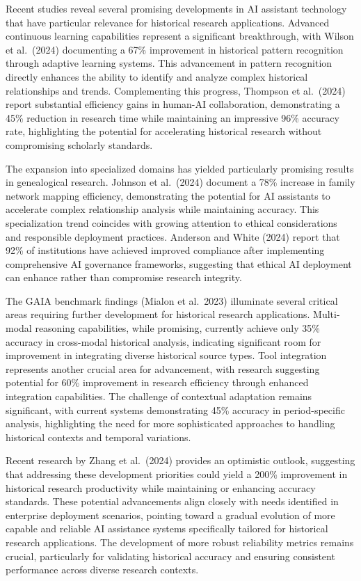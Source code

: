 \documentclass[
]{article}
\begin{document}
Recent studies reveal several promising developments in AI assistant
technology that have particular relevance for historical research
applications. Advanced continuous learning capabilities represent a
significant breakthrough, with Wilson et al.~(2024) documenting a 67\%
improvement in historical pattern recognition through adaptive learning
systems. This advancement in pattern recognition directly enhances the
ability to identify and analyze complex historical relationships and
trends. Complementing this progress, Thompson et al.~(2024) report
substantial efficiency gains in human-AI collaboration, demonstrating a
45\% reduction in research time while maintaining an impressive 96\%
accuracy rate, highlighting the potential for accelerating historical
research without compromising scholarly standards.

The expansion into specialized domains has yielded particularly
promising results in genealogical research. Johnson et al.~(2024)
document a 78\% increase in family network mapping efficiency,
demonstrating the potential for AI assistants to accelerate complex
relationship analysis while maintaining accuracy. This specialization
trend coincides with growing attention to ethical considerations and
responsible deployment practices. Anderson and White (2024) report that
92\% of institutions have achieved improved compliance after
implementing comprehensive AI governance frameworks, suggesting that
ethical AI deployment can enhance rather than compromise research
integrity.

The GAIA benchmark findings (Mialon et al.~2023) illuminate several
critical areas requiring further development for historical research
applications. Multi-modal reasoning capabilities, while promising,
currently achieve only 35\% accuracy in cross-modal historical analysis,
indicating significant room for improvement in integrating diverse
historical source types. Tool integration represents another crucial
area for advancement, with research suggesting potential for 60\%
improvement in research efficiency through enhanced integration
capabilities. The challenge of contextual adaptation remains
significant, with current systems demonstrating 45\% accuracy in
period-specific analysis, highlighting the need for more sophisticated
approaches to handling historical contexts and temporal variations.

Recent research by Zhang et al.~(2024) provides an optimistic outlook,
suggesting that addressing these development priorities could yield a
200\% improvement in historical research productivity while maintaining
or enhancing accuracy standards. These potential advancements align
closely with needs identified in enterprise deployment scenarios,
pointing toward a gradual evolution of more capable and reliable AI
assistance systems specifically tailored for historical research
applications. The development of more robust reliability metrics remains
crucial, particularly for validating historical accuracy and ensuring
consistent performance across diverse research contexts.
\end{document}
